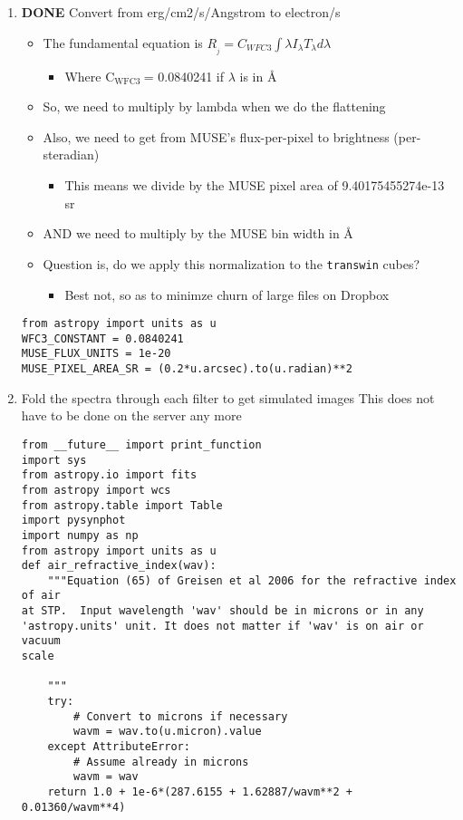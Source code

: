\documentclass[11pt]{article}
\begin{document}
\begin{enumerate}
\item {\bfseries\sffamily DONE} Convert from erg/cm2/s/Angstrom to electron/s
\label{sec:orgheadline29}
\begin{itemize}
\item The fundamental equation is \(R_{}_j = C_{WFC3 }\int \lambda I_\lambda T_\lambda d\lambda\)
\begin{itemize}
\item Where C\(_{\text{WFC3 }}\)= 0.0840241 if \(\lambda\) is in \AA{}
\end{itemize}
\item So, we need to multiply by lambda when we do the flattening
\item Also, we need to get from MUSE's flux-per-pixel to brightness (per-steradian)
\begin{itemize}
\item This means we divide by the MUSE pixel area of 9.40175455274e-13 sr
\end{itemize}
\item AND we need to multiply by the MUSE bin width in \AA{}
\item Question is, do we apply this normalization to the \texttt{transwin} cubes?
\begin{itemize}
\item Best not, so as to minimze churn of large files on Dropbox
\end{itemize}
\end{itemize}

\begin{verbatim}
from astropy import units as u
WFC3_CONSTANT = 0.0840241
MUSE_FLUX_UNITS = 1e-20 
MUSE_PIXEL_AREA_SR = (0.2*u.arcsec).to(u.radian)**2
\end{verbatim}
\item Fold the spectra through each filter to get simulated images
\label{sec:orgheadline30}
This does not have to be done on the server any more

\begin{verbatim}
from __future__ import print_function
import sys
from astropy.io import fits
from astropy import wcs
from astropy.table import Table
import pysynphot
import numpy as np
from astropy import units as u
def air_refractive_index(wav):
    """Equation (65) of Greisen et al 2006 for the refractive index of air
at STP.  Input wavelength 'wav' should be in microns or in any
'astropy.units' unit. It does not matter if 'wav' is on air or vacuum
scale

    """
    try:
        # Convert to microns if necessary
        wavm = wav.to(u.micron).value
    except AttributeError:
        # Assume already in microns
        wavm = wav
    return 1.0 + 1e-6*(287.6155 + 1.62887/wavm**2 + 0.01360/wavm**4)


\end{verbatim}
\end{enumerate}
\end{document}
